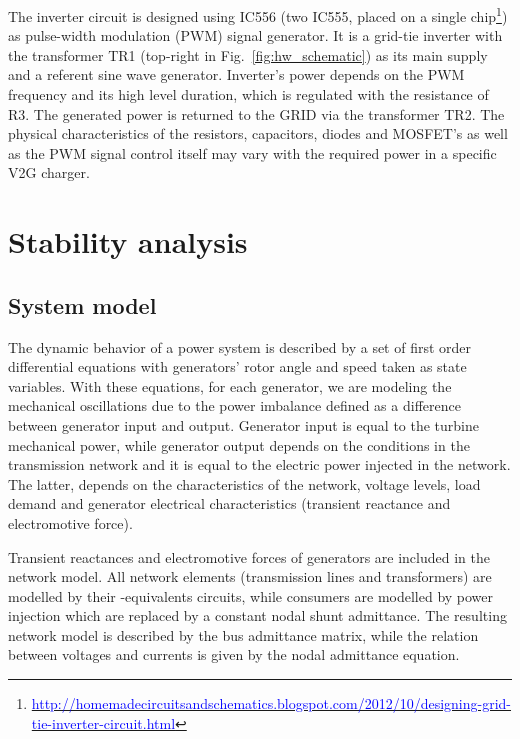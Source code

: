 \documentclass[final,12pt]{elsarticle}
\begin{document}
The inverter circuit is designed using IC556 (two IC555, placed on a single chip\footnote{\href{http://homemadecircuitsandschematics.blogspot.com/2012/10/designing-grid-tie-inverter-circuit.html}{\textcolor{blue}{http://homemadecircuitsandschematics.blogspot.com/2012/10/designing-grid-tie-inverter-circuit.html}}}) 
as pulse-width modulation (PWM) signal generator. It is a grid-tie inverter
with the transformer TR1 (top-right in Fig.~\ref{fig:hw_schematic}) as its
main supply and a referent sine wave generator. Inverter's power
depends on the PWM frequency and its high level duration, which is regulated with the resistance of R3. The generated power is returned to the GRID via the transformer TR2.
The physical characteristics of the resistors,
capacitors, diodes and MOSFET's as well as the PWM signal control itself may vary with the required power in a specific V2G charger.

\section{Stability analysis}
\label{results}

\subsection{System model}
\label{steady_state}

The dynamic behavior of a power system is described by a set of
first order differential equations with generators' rotor angle and speed taken
as state variables. With these equations, for each generator, we are modeling
the mechanical oscillations due to the power imbalance defined as a difference
between generator input and output. Generator input is equal to the turbine
mechanical power, while generator output depends on the conditions in the
transmission network and it is equal to the electric power injected in the
network. The latter, depends on the characteristics of the network, voltage
levels, load demand and generator electrical characteristics (transient
reactance and electromotive force).

Transient reactances and electromotive forces of generators are included in the
network model. All network elements (transmission lines and transformers) are
modelled by their -equivalents circuits, while consumers are modelled by
power injection which are replaced by a constant nodal shunt admittance.
The resulting network model is described by the bus admittance matrix, while the
relation between voltages and currents is given by the nodal admittance
equation.
\end{document}

